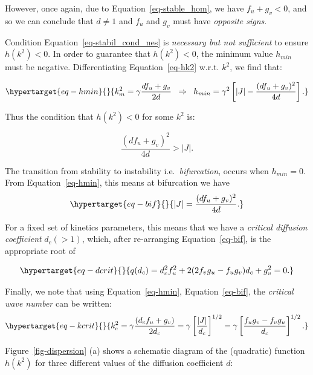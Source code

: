 \documentclass[
  letterpaper,
  DIV=11,
  numbers=noendperiod]{scrreprt}
\theoremstyle{plain}
\theoremstyle{definition}
\theoremstyle{plain}
\theoremstyle{remark}
\begin{document}
However, once again, due to Equation~\ref{eq-stable_hom}, we have
\(f_u+ g_v <0\), and so we can conclude that \(d\neq 1\) and \(f_u\) and
\(g_v\) must have \emph{opposite signs}.

Condition Equation~\ref{eq-stabil_cond_nes} is \emph{necessary but not
sufficient} to ensure \(h(k^2) <0\). In order to guarantee that
\(h(k^2) < 0\), the minimum value \(h_{min}\) must be negative.
Differentiating Equation~\ref{eq-hk2} w.r.t. \(k^2\), we find that:

\begin{equation}\protect\hypertarget{eq-hmin}{}{
k^2_{m} = \gamma \frac{d f_u + g_v}{2d} \;\; \Rightarrow \;\; h_{min} = \gamma^2 \left[ | J | - \frac{(df_u + g_v)^2}{4d} \right].
}\label{eq-hmin}\end{equation}

Thus the condition that \(h(k^2) < 0\) for some \(k^2\) is:

\[
\frac{(df_u + g_v)^2}{4d} > |J|.
\]

The transition from stability to instability i.e.~\emph{bifurcation},
occurs when \(h_{min} = 0\). From Equation~\ref{eq-hmin}, this means at
bifurcation we have \begin{equation}\protect\hypertarget{eq-bif}{}{
|J| = \frac{(df_u + g_v)^2}{4d}.
}\label{eq-bif}\end{equation}

For a fixed set of kinetics parameters, this means that we have a
\emph{critical diffusion coefficient} \(d_c(>1)\), which, after
re-arranging Equation~\ref{eq-bif}, is the appropriate root of

\begin{equation}\protect\hypertarget{eq-dcrit}{}{
q(d_c) = d^2_c f_u^2 + 2( 2 f_v g_u - f_u g_v) d_c + g_v^2 =0.
}\label{eq-dcrit}\end{equation}

Finally, we note that using Equation~\ref{eq-hmin},
Equation~\ref{eq-bif}, the \emph{critical wave number} can be written:
\begin{equation}\protect\hypertarget{eq-kcrit}{}{
k_c^2 =\gamma  \frac{( d_c f_u + g_v)} { 2 d_c} = \gamma \left[ \frac {|J|}{d_c} \right]^{1/2} = \gamma \left[ \frac{f_u g_v - f_v g_u}{d_c} \right]^{1/2}. 
}\label{eq-kcrit}\end{equation}

Figure~\ref{fig-dispersion} (a) shows a schematic diagram of the
(quadratic) function \(h(k^2)\) for three different values of the
diffusion coefficient \(d\):
\end{document}
